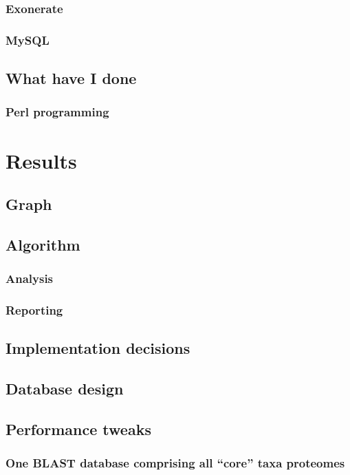 \documentclass[a4paper]{scrreprt}
\begin{document}
		\subsection{Exonerate}
		\subsection{MySQL}
			
	\section{What have I done} %
		\subsection{Perl programming}
\chapter{Results}
	
	\section{Graph}
	\section{Algorithm}
		\subsection{Analysis}
			
		\subsection{Reporting}
			
	\section{Implementation decisions}
	\section{Database design}
		
	\section{Performance tweaks}
		\subsection{One BLAST database comprising all ``core'' taxa proteomes}
\end{document}
